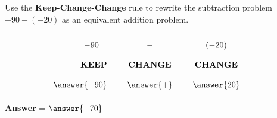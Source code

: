 \documentclass{ximera}[font=12pt]
\begin{document}
\begin{problem}
    Use the \textbf{Keep-Change-Change} rule to rewrite the subtraction problem $-90 -(-20)$ as an equivalent 
    addition problem.  

    \[
    \renewcommand{\arraystretch}{2}
    \begin{array}{r @{\hskip 24pt} c @{\hskip 24pt} c @{\hskip 24pt} c}
    -90 \quad & - & (-20) \\
    \textbf{KEEP} & \textbf{CHANGE} & \textbf{CHANGE} \\
    \answer{-90} & \answer{+} & \answer{20}
    \end{array}
    \]

\textcolor{orange!80!black}{\textbf{Answer}} = $\answer{-70}$
                                                   
\end{problem}    
\end{document}
